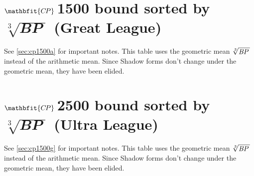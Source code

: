 \section[\CP1500 bound sorted by \protect{$\sqrt[3]{\BP\,}$} (Great League)]%
{$\mathbfit{C\kern -1ptP}$\,1500 bound sorted by $\sqrt[3]{\mathbfit{BP}\;}$ (Great League)\label{sec:cp1500g}}
See \autoref{sec:cp1500a} for important notes.
This table uses the geometric mean $\sqrt[3]{\BP\,}$ instead of the arithmetic mean.
Since Shadow forms don't change under the geometric mean, they have been elided.

\section[\CP2500 bound sorted by \protect{$\sqrt[3]{\BP\,}$} (Ultra League)]%
{$\mathbfit{C\kern -1ptP}$\,2500 bound sorted by $\sqrt[3]{\mathbfit{BP}\;}$ (Ultra League)\label{sec:cp2500g}}
See \autoref{sec:cp1500g} for important notes.
This table uses the geometric mean $\sqrt[3]{\mbox{$\mathit{BP}$}{}\,}$ instead of the arithmetic mean.
Since Shadow forms don't change under the geometric mean, they have been elided.



